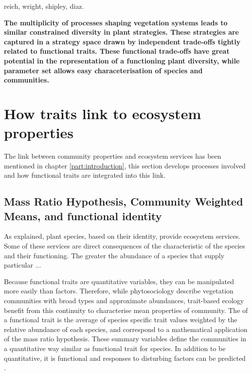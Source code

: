 reich, wright, shipley, diaz.

\textbf{The multiplicity of processes shaping vegetation systems leads to similar constrained diversity in plant strategies. These strategies are captured in a strategy space drawn by independent trade-offs tightly related to functional traits. These functional trade-offs have great potential in the representation of a functioning plant diversity, while parameter set allows easy characeterisation of species and communities.}



\section{How traits link to ecosystem properties}

The link between community properties and ecosystem services has been mentioned in chapter \ref{part:introduction}, this section develops processes involved and how functional traits are integrated into this link.

\subsection{Mass Ratio Hypothesis, Community Weighted Means, and functional identity}

As explained, plant species, based on their identity, provide ecosystem services. Some of these services are direct consequences of the characteristic of the species and their functioning. The greater the abundance of a species that supply particular ...

Because functional traits are quantitative variables, they can be manipulated more easily than factors. Therefore, while phytosociology describe vegetation communities with broad types and approximate abundances, trait-based ecology benefit from this continuity to characterise mean properties of community. The  of a functional trait is the average of species specific trait values weighted by the relative abundance of each species, and correspond to a mathematical application of the mass ratio hypothesis. These summary variables define the communities in a quantitative way similar as functional trait for species. In addition to be quantitative, it is functional and responses to disturbing factors can be predicted \parencite{lavorel_predicting_2002}.



